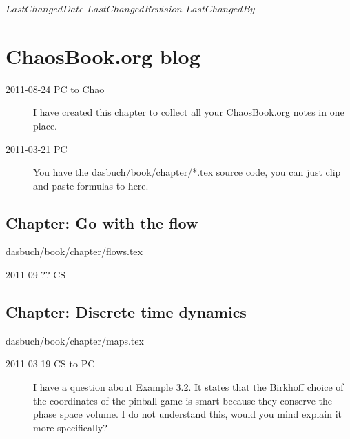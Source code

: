 \ifsvnmulti
{}
{$LastChangedDate$}
{$LastChangedRevision$} {$LastChangedBy$}
\fi


\chapter{ChaosBook.org blog}
\label{chap:ChaosBook}

\begin{description}

\item[2011-08-24 PC to Chao]
I have created this chapter to collect all your ChaosBook.org
notes in one place.


\item[2011-03-21 PC] You have the dasbuch/book/chapter/*.tex source
code, you can just clip and paste formulas to here.

\end{description}


\section{Chapter: Go with the flow}\noindent dasbuch/book/chapter/flows.tex
\begin{description}\item[2011-09-?? CS]

\end{description}


\section{Chapter: Discrete time dynamics}\noindent dasbuch/book/chapter/maps.tex
\begin{description}

\item[2011-03-19 CS to PC]
I have a question about Example 3.2. It states that
   the Birkhoff choice of the coordinates of the pinball game is smart because
   they conserve the phase space volume. I do not understand this, would
   you mind explain it more specifically?


\end{description}

